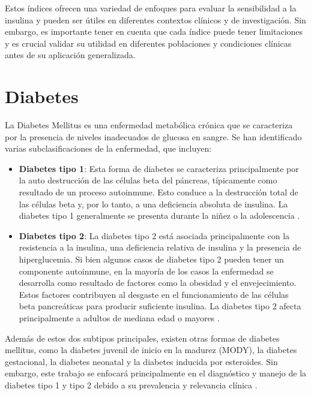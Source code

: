 Estos índices ofrecen una variedad de enfoques para evaluar la sensibilidad a la insulina y pueden ser útiles en diferentes contextos clínicos y de investigación. Sin embargo, es importante tener en cuenta que cada índice puede tener limitaciones y es crucial validar su utilidad en diferentes poblaciones y condiciones clínicas antes de su aplicación generalizada.



\section{Diabetes}

La Diabetes Mellitus es una enfermedad metabólica crónica que se caracteriza por la presencia de niveles inadecuados de glucosa en sangre. Se han identificado varias subclasificaciones de la enfermedad, que incluyen:

\begin{itemize}
    \item \textbf{Diabetes tipo 1}: Esta forma de diabetes se caracteriza principalmente por la auto destrucción de las células beta del páncreas, típicamente como resultado de un proceso autoinmune. Esto conduce a la destrucción total de las células beta y, por lo tanto, a una deficiencia absoluta de insulina. La diabetes tipo 1 generalmente se presenta durante la niñez o la adolescencia \cite{diabetes}.


    \item \textbf{Diabetes tipo 2}: La diabetes tipo 2 está asociada principalmente con la resistencia a la insulina, una deficiencia relativa de insulina y la presencia de hiperglucemia. Si bien algunos casos de diabetes tipo 2 pueden tener un componente autoinmune, en la mayoría de los casos la enfermedad se desarrolla como resultado de factores como la obesidad y el envejecimiento. Estos factores contribuyen al desgaste en el funcionamiento de las células beta pancreáticas para producir suficiente insulina. La diabetes tipo 2 afecta principalmente a adultos de mediana edad o mayores \cite{computational}.
\end{itemize}

Además de estos dos subtipos principales, existen otras formas de diabetes mellitus, como la diabetes juvenil de inicio en la madurez (MODY), la diabetes gestacional, la diabetes neonatal y la diabetes inducida por esteroides. Sin embargo, este trabajo se enfocará principalmente en el diagnóstico y manejo de la diabetes tipo 1 y tipo 2 debido a su prevalencia y relevancia clínica \cite{diabetes}.

